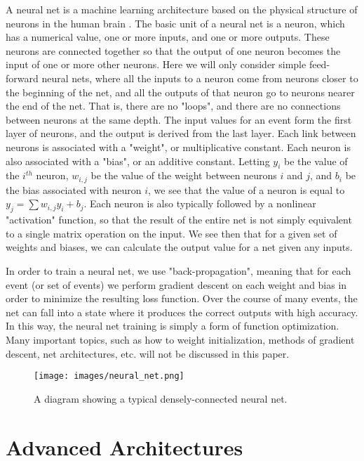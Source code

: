A neural net is a machine learning architecture based on the physical structure of neurons in the human brain \cite{neural_net}. The basic unit of a neural net is a neuron, which has a numerical value, one or more inputs, and one or more outputs. These neurons are connected together so that the output of one neuron becomes the input of one or more other neurons. Here we will only consider simple feed-forward neural nets, where all the inputs to a neuron come from neurons closer to the beginning of the net, and all the outputs of that neuron go to neurons nearer the end of the net. That is, there are no "loops", and there are no connections between neurons at the same depth. The input values for an event form the first layer of neurons, and the output is derived from the last layer. Each link between neurons is associated with a "weight", or multiplicative constant. Each neuron is also associated with a "bias", or an additive constant. Letting $y_i$ be the value of the $i^{th}$ neuron, $w_{i,j}$ be the value of the weight between neurons $i$ and $j$, and $b_i$ be the bias associated with neuron $i$, we see that the value of a neuron is equal to $y_j = \sum{w_{i,j}y_i} + b_j$. Each neuron is also typically followed by a nonlinear "activation" function, so that the result of the entire net is not simply equivalent to a single matrix operation on the input. We see then that for a given set of weights and biases, we can calculate the output value for a net given any inputs.

In order to train a neural net, we use "back-propagation", meaning that for each event (or set of events) we perform gradient descent on each weight and bias in order to minimize the resulting loss function. Over the course of many events, the net can fall into a state where it produces the correct outputs with high accuracy. In this way, the neural net training is simply a form of function optimization. Many important topics, such as how to weight initialization, methods of gradient descent, net architectures, etc. will not be discussed in this paper.

\begin{figure}[t]
    \centering
    \texttt{[image: images/neural\_net.png]}
    \caption{A diagram showing a typical densely-connected neural net.}
    \label{neural_net}
\end{figure}

\chapter{Advanced Architectures}

